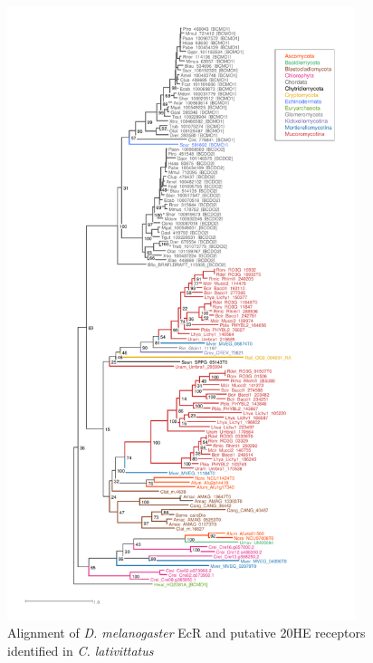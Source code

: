 \begin{figure}[tbp]
  \includegraphics[width=4in]{./Chapter_Coelomomyces/img/BCMO1DO2.png}
  \caption[20HE alignment]{Alignment of \textit{D. melanogaster} EcR and putative 20HE receptors identified in \textit{C. lativittatus} }
  \label{fig:ChClat_20HEalign}
\end{figure}


